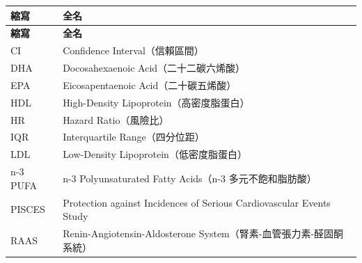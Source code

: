 \documentclass[12pt,a4paper]{article}
\begin{document}
\begin{longtable}{p{4cm}p{10cm}}
\toprule
\textbf{縮寫} & \textbf{全名} \\
\midrule
\endfirsthead

\toprule
\textbf{縮寫} & \textbf{全名} \\
\midrule
\endhead

\bottomrule
\endfoot

CI & Confidence Interval（信賴區間） \\
DHA & Docosahexaenoic Acid（二十二碳六烯酸） \\
EPA & Eicosapentaenoic Acid（二十碳五烯酸） \\
HDL & High-Density Lipoprotein（高密度脂蛋白） \\
HR & Hazard Ratio（風險比） \\
IQR & Interquartile Range（四分位距） \\
LDL & Low-Density Lipoprotein（低密度脂蛋白） \\
n-3 PUFA & n-3 Polyunsaturated Fatty Acids（n-3 多元不飽和脂肪酸） \\
PISCES & Protection against Incidences of Serious Cardiovascular Events Study \\
RAAS & Renin-Angiotensin-Aldosterone System（腎素-血管張力素-醛固酮系統） \\
\bottomrule
\end{longtable}
\end{document}
